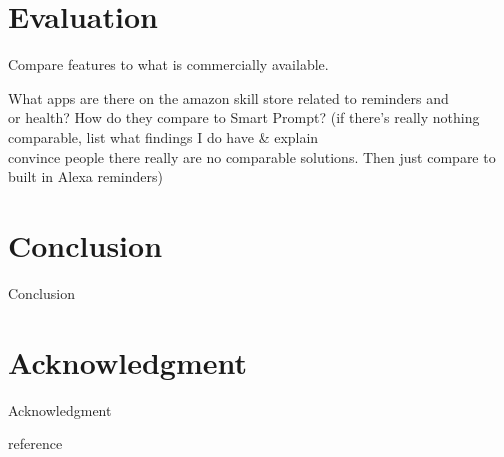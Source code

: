 \documentclass[conference]{IEEEtran}
\begin{document}
\section{Evaluation}

Compare features to what is commercially available. 

What apps are there on the amazon skill store related to reminders and\\or health? How do they compare to Smart Prompt? 
(if there's really nothing comparable, list what findings I do have \& explain\\convince people there really are no comparable solutions. Then just compare to built in Alexa reminders)


\section{Conclusion}

Conclusion


\section*{Acknowledgment}

Acknowledgment


\begin{thebibliography}{00}
 reference
\end{thebibliography}
\end{document}
